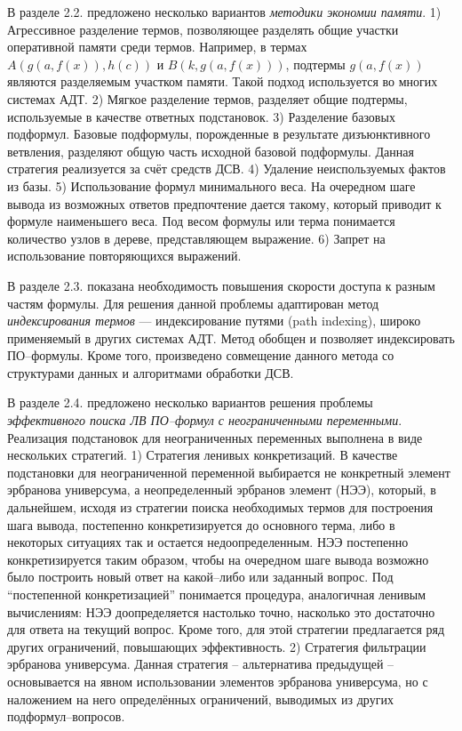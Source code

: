 \documentclass[a4paper]{report}
\begin{document}
В разделе 2.2. предложено несколько вариантов \emph{методики экономии памяти}. 1) Агрессивное разделение термов, позволяющее разделять общие участки оперативной памяти среди термов. Например, в термах $A(g(a,f(x)),h(c))$ и $B(k,g(a,f(x)))$, подтермы $g(a,f(x))$ являются разделяемым участком памяти. Такой подход используется во многих системах АДТ. 2) Мягкое разделение термов, разделяет общие подтермы, используемые в качестве ответных подстановок. 3) Разделение базовых подформул. Базовые подформулы, порожденные в результате дизъюнктивного ветвления, разделяют общую часть исходной базовой подформулы. Данная стратегия реализуется за счёт средств ДСВ. 4) Удаление неиспользуемых фактов из базы. 5) Использование формул минимального веса. На очередном шаге вывода из возможных ответов предпочтение дается такому, который приводит к формуле наименьшего веса. Под весом формулы или терма понимается количество узлов в дереве, представляющем выражение. 6) Запрет на использование повторяющихся выражений.

В разделе 2.3. показана необходимость повышения скорости доступа к разным частям формулы. Для решения данной проблемы адаптирован метод \emph{индексирования термов} --- индексирование путями (path indexing), широко применяемый в других системах АДТ. Метод обобщен и позволяет индексировать ПО--формулы. Кроме того, произведено совмещение данного метода со структурами данных и алгоритмами обработки ДСВ.

В разделе 2.4. предложено несколько вариантов решения проблемы \emph{эффективного поиска ЛВ ПО--формул с неограниченными переменными}. Реализация подстановок для неограниченных переменных выполнена в виде нескольких стратегий. 1) Стратегия ленивых конкретизаций. В качестве подстановки для неограниченной переменной выбирается не конкретный элемент эрбранова универсума, а неопределенный эрбранов элемент (НЭЭ), который, в дальнейшем, исходя из стратегии поиска необходимых термов для построения шага вывода, постепенно конкретизируется до основного терма, либо в некоторых ситуациях так и остается недоопределенным. НЭЭ постепенно конкретизируется таким образом, чтобы на очередном шаге вывода возможно было построить новый ответ на какой--либо или заданный вопрос. Под ``постепенной конкретизацией'' понимается процедура, аналогичная ленивым вычислениям: НЭЭ доопределяется настолько точно, насколько это достаточно для ответа на текущий вопрос. Кроме того, для этой стратегии предлагается ряд других ограничений, повышающих эффективность.  2) Стратегия фильтрации эрбранова универсума. Данная стратегия -- альтернатива предыдущей -- основывается на явном использовании элементов эрбранова универсума, но с наложением на него определённых ограничений, выводимых из других подформул--вопросов.
\end{document}
